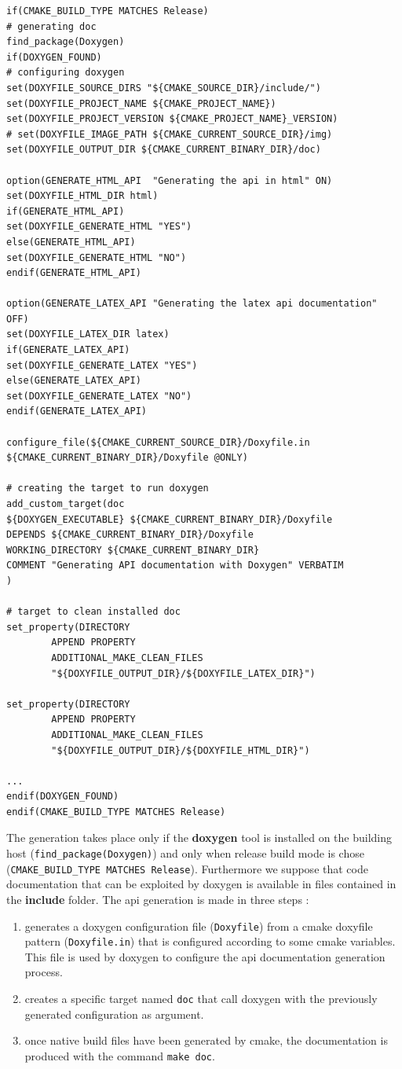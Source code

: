 \documentclass[12pt,a4paper]{article}
\begin{document}
\begin{verbatim}
if(CMAKE_BUILD_TYPE MATCHES Release)
# generating doc
find_package(Doxygen)
if(DOXYGEN_FOUND)
# configuring doxygen
set(DOXYFILE_SOURCE_DIRS "${CMAKE_SOURCE_DIR}/include/")
set(DOXYFILE_PROJECT_NAME ${CMAKE_PROJECT_NAME})
set(DOXYFILE_PROJECT_VERSION ${CMAKE_PROJECT_NAME}_VERSION)
# set(DOXYFILE_IMAGE_PATH ${CMAKE_CURRENT_SOURCE_DIR}/img)
set(DOXYFILE_OUTPUT_DIR ${CMAKE_CURRENT_BINARY_DIR}/doc)

option(GENERATE_HTML_API  "Generating the api in html" ON)
set(DOXYFILE_HTML_DIR html)
if(GENERATE_HTML_API)
set(DOXYFILE_GENERATE_HTML "YES")
else(GENERATE_HTML_API)
set(DOXYFILE_GENERATE_HTML "NO")
endif(GENERATE_HTML_API)

option(GENERATE_LATEX_API "Generating the latex api documentation" OFF)
set(DOXYFILE_LATEX_DIR latex)
if(GENERATE_LATEX_API)
set(DOXYFILE_GENERATE_LATEX "YES")
else(GENERATE_LATEX_API)
set(DOXYFILE_GENERATE_LATEX "NO")
endif(GENERATE_LATEX_API)
 		
configure_file(${CMAKE_CURRENT_SOURCE_DIR}/Doxyfile.in 
${CMAKE_CURRENT_BINARY_DIR}/Doxyfile @ONLY)

# creating the target to run doxygen
add_custom_target(doc
${DOXYGEN_EXECUTABLE} ${CMAKE_CURRENT_BINARY_DIR}/Doxyfile
DEPENDS ${CMAKE_CURRENT_BINARY_DIR}/Doxyfile
WORKING_DIRECTORY ${CMAKE_CURRENT_BINARY_DIR}
COMMENT "Generating API documentation with Doxygen" VERBATIM
)

# target to clean installed doc
set_property(DIRECTORY 
		APPEND PROPERTY
		ADDITIONAL_MAKE_CLEAN_FILES
		"${DOXYFILE_OUTPUT_DIR}/${DOXYFILE_LATEX_DIR}")

set_property(DIRECTORY 
		APPEND PROPERTY
		ADDITIONAL_MAKE_CLEAN_FILES
		"${DOXYFILE_OUTPUT_DIR}/${DOXYFILE_HTML_DIR}")
				
...
endif(DOXYGEN_FOUND)
endif(CMAKE_BUILD_TYPE MATCHES Release)
\end{verbatim}
The generation takes place only if the \textbf{doxygen} tool is installed on the building host (\verb|find_package(Doxygen)|) and only when release build mode is chose (\verb|CMAKE_BUILD_TYPE MATCHES Release|). Furthermore we suppose that code documentation that can be exploited by doxygen is available in files contained in the \textbf{include} folder. The api generation is made in three steps :
\begin{enumerate}
\item generates a doxygen configuration file (\texttt{Doxyfile}) from a cmake doxyfile pattern (\texttt{Doxyfile.in}) that is configured according to some cmake variables. This file is used by doxygen to configure the api documentation generation process.
\item creates a specific target named \texttt{doc} that call doxygen with the previously generated configuration as argument.
\item once native build files have been generated by cmake, the documentation is produced with the command \texttt{make doc}.
\end{enumerate}
\end{document}
